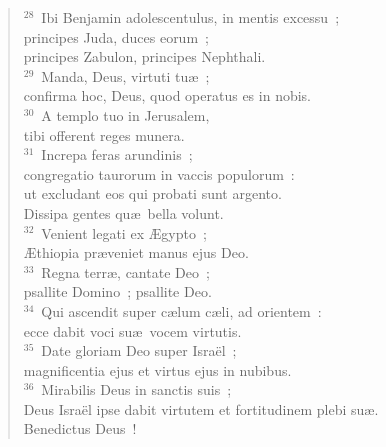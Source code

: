\begin{flushleft}
\begin{verse}
${}^{28}$~Ibi Benjamin adolescentulus, in mentis excessu~;\\ principes Juda, duces eorum~;\\ principes Zabulon, principes Nephthali.\\
${}^{29}$~Manda, Deus, virtuti tu\ae~;\\ confirma hoc, Deus, quod operatus es in nobis.\\
${}^{30}$~A templo tuo in Jerusalem,\\ tibi offerent reges munera.\\
${}^{31}$~Increpa feras arundinis~;\\ congregatio taurorum in vaccis populorum~:\\ ut excludant eos qui probati sunt argento.\\ Dissipa gentes qu\ae\ bella volunt.\\
${}^{32}$~Venient legati ex \AE gypto~;\\ \AE thiopia pr\ae veniet manus ejus Deo.\\
${}^{33}$~Regna terr\ae , cantate Deo~;\\ psallite Domino~; psallite Deo.\\
${}^{34}$~Qui ascendit super c\ae lum c\ae li, ad orientem~:\\ ecce dabit voci su\ae\ vocem virtutis.\\
${}^{35}$~Date gloriam Deo super Isra\"el~;\\ magnificentia ejus et virtus ejus in nubibus.\\
${}^{36}$~Mirabilis Deus in sanctis suis~;\\ Deus Isra\"el ipse dabit virtutem et fortitudinem plebi su\ae .\\ Benedictus Deus~!\end{verse}\end{flushleft}


